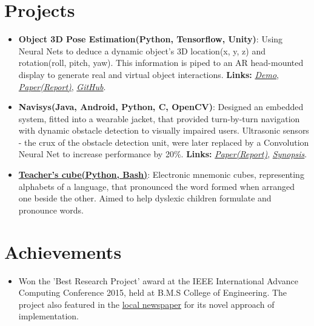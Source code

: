 \documentclass[letterpaper,11pt]{article}
\newcommand{\resumeItem}[2]{
  \item\small{
    \textbf{#1}{: #2 \vspace{-2pt}}
  }
}
\newcommand{\resumePoint}[1]{
  \item\small{#1}
}
\newcommand{\resumeSubItem}[2]{\resumeItem{#1}{#2}\vspace{-4pt}}
\newcommand{\resumeSubHeadingListStart}{\begin{itemize}[leftmargin=*]}
\newcommand{\resumeSubHeadingListEnd}{\end{itemize}\vspace{-10pt}}
\begin{document}
%

\section{Projects}
  \resumeSubHeadingListStart
    \resumeSubItem{Object 3D Pose Estimation(Python, Tensorflow, Unity)}
      {Using Neural Nets to deduce a dynamic object\rq s 3D location(x, y, z) and rotation(roll, pitch, yaw). This information is piped to an AR head-mounted display to generate real and virtual object interactions. \textbf{Links:}
      \href{https://drive.google.com/file/d/1kCepKQxR73tUTLuvmd1YL3sIbj1GxDdc/view?usp=sharing}{\textit{Demo}}, \href{https://drive.google.com/file/d/1mRwSJ8p2-g-gtBGl1A8seRB8SojWQphm/view?usp=sharing}{\textit{Paper(Report)}}, \href{https://github.com/nikhilsu/Object-location-detection}{\textit{GitHub}}.}
    \resumeSubItem{Navisys(Java, Android, Python, C, OpenCV)}
      {Designed an embedded system, fitted into a wearable jacket, that provided turn-by-turn navigation with dynamic obstacle detection to visually impaired users. Ultrasonic sensors - the crux of the obstacle detection unit, were later replaced by a Convolution Neural Net to increase performance by 20\%. \textbf{Links:}
      \href{https://drive.google.com/file/d/1bFHeZ7-7uwZ0spir3YQ7r0maWdLteEtu/view?usp=sharing}{\textit{Paper(Report)}},
      \href{https://drive.google.com/file/d/1JWB67U2jjTG7cXZFVjRPVGKsv-rRhgUQ/view?usp=sharing}{\textit{Synopsis}}.}
    \resumeSubItem{\href{https://www.dropbox.com/s/grnct56cpmsiw6c/20160208_234825.mp4?dl=0}{Teacher\rq s cube(Python, Bash)}}
      {Electronic mnemonic cubes, representing alphabets of a language, that pronounced the word formed when arranged one beside the other. Aimed to help dyslexic children formulate and pronounce words.}
    \resumeSubHeadingListEnd

\section{Achievements}
  \resumeSubHeadingListStart
    \resumePoint{Won the 'Best Research Project' award at the IEEE International Advance Computing Conference 2015, held at B.M.S College of Engineering. The project also featured in the \href{https://drive.google.com/open?id=0B0vNhKZyi8qyam1fQ3lfaE1hMkE}{local newspaper} for its novel approach of implementation.}
  \resumeSubHeadingListEnd
\end{document}
